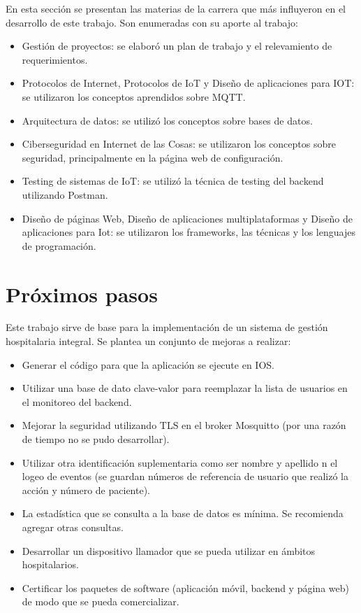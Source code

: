 En esta sección se presentan las materias de la carrera que más influyeron en el desarrollo de este trabajo. Son enumeradas con su aporte al trabajo:

\begin{itemize}
\item Gestión de proyectos: se elaboró un plan de trabajo y el relevamiento de requerimientos.
\item Protocolos de Internet, Protocolos de IoT y Diseño de aplicaciones para IOT: se utilizaron los conceptos aprendidos sobre MQTT.
\item Arquitectura de datos: se utilizó los conceptos sobre bases de datos.
\item Ciberseguridad en Internet de las Cosas: se utilizaron los conceptos sobre seguridad, principalmente en la página web de configuración.
\item Testing de sistemas de IoT: se utilizó la técnica de testing del backend utilizando Postman.
\item Diseño de páginas Web, Diseño de aplicaciones multiplataformas y Diseño de aplicaciones para Iot: se utilizaron los frameworks, las técnicas y los lenguajes de programación.
\end{itemize}

\section{Próximos pasos}


Este trabajo sirve de base para la implementación de un sistema de gestión hospitalaria integral. Se plantea un conjunto de mejoras a realizar:

\begin{itemize}
\item Generar el código para que la aplicación se ejecute en IOS.
\item Utilizar una base de dato clave-valor para reemplazar la lista de usuarios en el monitoreo del backend.
\item Mejorar la seguridad utilizando TLS en el broker Mosquitto (por una razón de tiempo no se pudo desarrollar).
\item Utilizar otra identificación suplementaria como ser nombre y apellido n el logeo de eventos (se guardan números de referencia de usuario que realizó la acción y número de paciente). 
\item La estadística que se consulta a la base de datos es mínima. Se recomienda agregar otras consultas.
\item Desarrollar un dispositivo llamador que se pueda utilizar en ámbitos hospitalarios.
\item Certificar los paquetes de software (aplicación móvil, backend y página web) de modo que se pueda comercializar.

\end{itemize}
